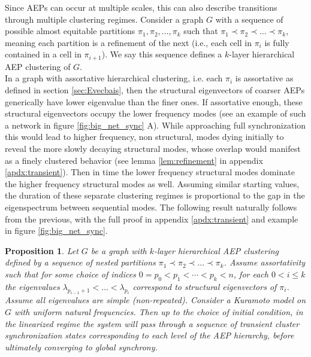 \documentclass[%
 aip,
 amsmath,amssymb,
preprint,
reprint, onecolumn %
]{revtex4-1}
\newtheorem{prop}[theorem]{Proposition}
\begin{document}
Since AEPs can occur at multiple scales, this can also describe transitions through multiple clustering regimes.
Consider a graph $G$ with a sequence of possible almost equitable partitions $\pi_1, \pi_2, \dots, \pi_k$ such that $\pi_1 \prec \pi_2 \prec \dots \prec \pi_k$, meaning each partition is a refinement of the next (i.e., each cell in $\pi_i$ is fully contained in a cell in $\pi_{i+1}$). We say this sequence defines a $k$-layer hierarchical AEP clustering of $G$.\\

In a graph with assortative hierarchical clustering, i.e. each $\pi_i$ is assortative as defined in section \ref{sec:Evecbais}, then the structural eigenvectors of coarser AEPs generically have lower eigenvalue than the finer ones.\cite{krzakala_spectral_2013, schaub_hierarchical_2023} If assortative enough, these structural eigenvectors occupy the lower frequency modes (see an example of such a network in figure \ref{fig:big_net_sync} A). While approaching full synchronization this would lead to higher frequency, non structural, modes dying initially to reveal the more slowly decaying structural modes, whose overlap would manifest as a finely clustered behavior (see lemma \ref{lem:refinement} in appendix \ref{apdx:transient}). Then in time the lower frequency structural modes dominate the higher frequency structural modes as well. Assuming similar starting values, the duration of these separate clustering regimes is proportional to the gap in the eigenspectrum between sequential modes. The following result naturally follows from the previous, with the full proof in appendix \ref{apdx:transient} and example in figure \ref{fig:big_net_sync}.

\begin{prop}\label{prop:transienthier}
    Let $G$ be a graph with $k$-layer hierarchical AEP clustering defined by a sequence of nested partitions $\pi_1 \prec \pi_2 \prec \dots \prec \pi_k$. Assume assortativity such that for some choice of indices $0=p_0<p_1<\cdots<p_k<n$, for each $0<i\leq k$ the eigenvalues $\lambda_{p_{i-1}+1}<\dotsc < \lambda_{p_i}$ correspond to structural eigenvectors of $\pi_i$. Assume all eigenvalues are simple (non-repeated).
    Consider a Kuramoto model on $G$ with uniform natural frequencies. Then up to the choice of initial condition, in the linearized regime the system will pass through a sequence of transient cluster synchronization states corresponding to each level of the AEP hierarchy, before ultimately converging to global synchrony.
\end{prop}
\end{document}

